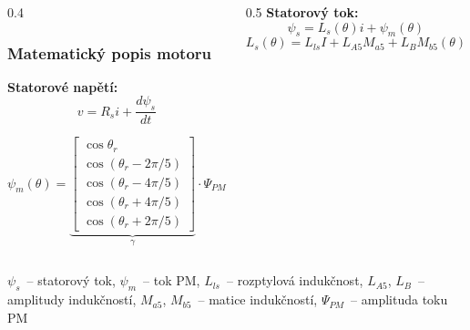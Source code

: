 \documentclass[%
  12pt,       				%
	t,                  %
	aspectratio=1610,   %
	unicode,						%
]{beamer}				    	%
\begin{document}
\begin{frame}
	\begin{columns}[T]
		\begin{column}{0.4\textwidth}
			\frametitle{Matematický popis motoru}
			\textbf{Statorové napětí:}
			\begin{equation*}
				v=R_s i + \frac{d\psi_s}{dt} 
			\end{equation*}

	
	
	\begin{equation*}
		\label{eq:flux rotace abc} 
		\psi_m(\theta)  = 
		\underbrace{
			\begin{bmatrix}
				\cos \theta_r \\
				\cos(\theta_r - 2\pi/5) \\
				\cos(\theta_r - 4\pi/5) \\
				\cos(\theta_r + 4\pi/5) \\
				\cos(\theta_r + 2\pi/5)
			\end{bmatrix}}_\gamma
			\cdot \Psi_{PM}
		\end{equation*}
	\end{column}

	\begin{column}{0.5\textwidth}
		\textbf{Statorový tok:}
			\begin{equation*}
			\psi_s = L_s(\theta) i + \psi_m(\theta)
			\end{equation*}
		\begin{equation*}
			\label{eq:model abc induknost}
			L_{s}(\theta) = L_{ls}I + L_{A5}M_{a5} + L_{B}M_{b5}(\theta)
		\end{equation*}
			{}
	\end{column}
\end{columns}
\vspace{0.5ex}
{\small  $\psi_s$~-- statorový tok, $\psi_m$~-- tok PM, $L_{ls}$~-- rozptylová indukčnost, $L_{A5}$, $L_B$~-- amplitudy indukčností, $M_{a5}$, $M_{b5}$~-- matice indukčností, $\Psi_{PM}$~-- amplituda toku PM}

\end{frame}
\end{document}
